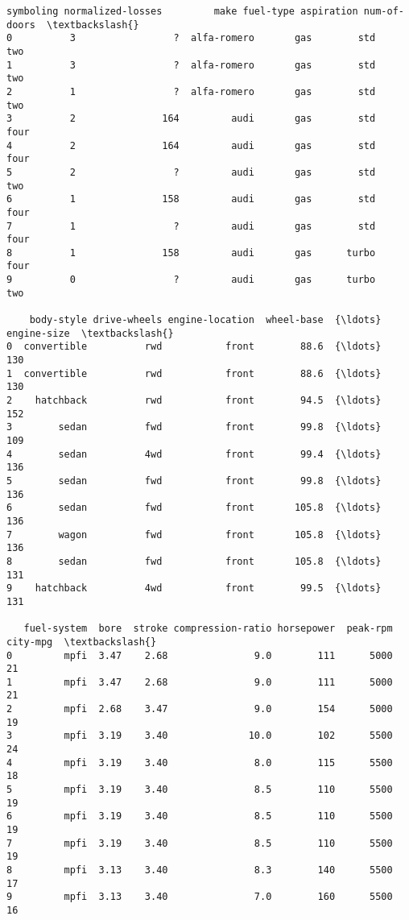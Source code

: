 \documentclass[11pt]{article}
\makeatletter
\newcommand{\boxspacing}{\kern\kvtcb@left@rule\kern\kvtcb@boxsep}
\newcommand{\prompt}[4]{
        \ttfamily\llap{{\color{#2}[#3]:\hspace{3pt}#4}}\vspace{-\baselineskip}
    }
\makeatother
\begin{document}
            \begin{tcolorbox}[breakable, size=fbox, boxrule=.5pt, pad at break*=1mm, opacityfill=0]
\prompt{Out}{outcolor}{6}{\boxspacing}
\begin{Verbatim}[commandchars=\\\{\}]
   symboling normalized-losses         make fuel-type aspiration num-of-doors  \textbackslash{}
0          3                 ?  alfa-romero       gas        std          two
1          3                 ?  alfa-romero       gas        std          two
2          1                 ?  alfa-romero       gas        std          two
3          2               164         audi       gas        std         four
4          2               164         audi       gas        std         four
5          2                 ?         audi       gas        std          two
6          1               158         audi       gas        std         four
7          1                 ?         audi       gas        std         four
8          1               158         audi       gas      turbo         four
9          0                 ?         audi       gas      turbo          two

    body-style drive-wheels engine-location  wheel-base  {\ldots}  engine-size  \textbackslash{}
0  convertible          rwd           front        88.6  {\ldots}          130
1  convertible          rwd           front        88.6  {\ldots}          130
2    hatchback          rwd           front        94.5  {\ldots}          152
3        sedan          fwd           front        99.8  {\ldots}          109
4        sedan          4wd           front        99.4  {\ldots}          136
5        sedan          fwd           front        99.8  {\ldots}          136
6        sedan          fwd           front       105.8  {\ldots}          136
7        wagon          fwd           front       105.8  {\ldots}          136
8        sedan          fwd           front       105.8  {\ldots}          131
9    hatchback          4wd           front        99.5  {\ldots}          131

   fuel-system  bore  stroke compression-ratio horsepower  peak-rpm city-mpg  \textbackslash{}
0         mpfi  3.47    2.68               9.0        111      5000       21
1         mpfi  3.47    2.68               9.0        111      5000       21
2         mpfi  2.68    3.47               9.0        154      5000       19
3         mpfi  3.19    3.40              10.0        102      5500       24
4         mpfi  3.19    3.40               8.0        115      5500       18
5         mpfi  3.19    3.40               8.5        110      5500       19
6         mpfi  3.19    3.40               8.5        110      5500       19
7         mpfi  3.19    3.40               8.5        110      5500       19
8         mpfi  3.13    3.40               8.3        140      5500       17
9         mpfi  3.13    3.40               7.0        160      5500       16


\end{Verbatim}
\end{tcolorbox}
\end{document}
